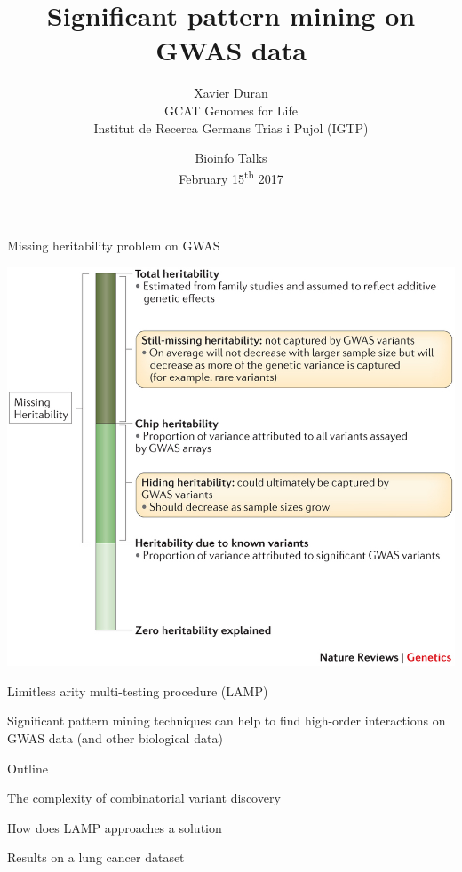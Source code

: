 \documentclass[ignorenonframetext,]{beamer}
\title{Significant pattern mining on GWAS data}
\author{Xavier Duran\\
GCAT Genomes for Life\\
Institut de Recerca Germans Trias i Pujol (IGTP)}
\date{Bioinfo Talks\\
February 15\textsuperscript{th} 2017}
\begin{document}
\frame{\titlepage}

\begin{frame}{Missing heritability problem on GWAS}

\includegraphics{images/nrg3786-f4.jpg}

\end{frame}

\begin{frame}{Limitless arity multi-testing procedure (LAMP)}

Significant pattern mining techniques can help to find high-order
interactions on GWAS data (and other biological data)

\pause

\begin{block}{Outline}

The complexity of combinatorial variant discovery

\pause

How does LAMP approaches a solution

\pause

Results on a lung cancer dataset

\end{block}

\end{frame}
\end{document}
